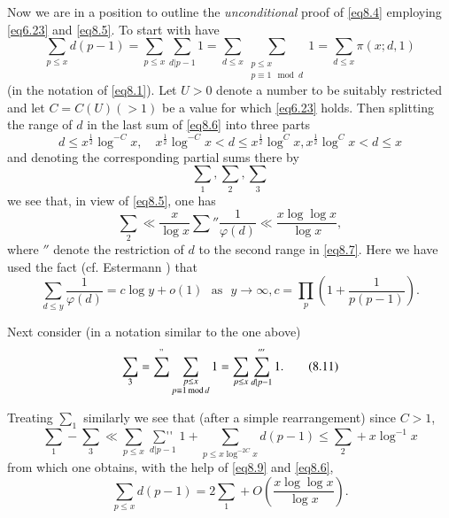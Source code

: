 Now we are in a position to outline the \textit{unconditional} proof
of \eqref{eq8.4} employing \eqref{eq6.23} and \eqref{eq8.5}. To start
with have   
\begin{equation*}
\sum_{p \leq x} d(p-1) = \sum_{p \leq x}\sum_{d | p-1}1 = \sum_{d \leq
  x} \sum_{\substack {p \leq x \\ {p \equiv 1 \mod d}}}1 = \sum_{d
  \leq x} \pi (x;d,1) \tag{8.6}\label{eq8.6} 
\end{equation*}
(in the notation of \eqref{eq8.1}). Let $U > 0$ denote a number to be
suitably restricted and let $C = C(U)( > 1)$ be a value for which
\eqref{eq6.23} holds. Then splitting the range of $d$ in the last sum of
\eqref{eq8.6} into three parts 
\begin{equation*}
d \leq x^{\frac{1}{2}} \log^{-C}x,\quad x^{\frac{1}{2}} \log^{-C}x < d
\leq x^{\frac{1}{2}} \log^{C}x, x^{\frac{1}{2}} \log^{C}x < d \leq x
\tag{8.7}\label{eq8.7} 
\end{equation*}
and denoting the corresponding partial sums there by 
\begin{equation*}
\sum_1 , \sum_2, \sum_3 \tag{8.8}\label{eq8.8}
\end{equation*}
we see that, in view of \eqref{eq8.5}, one has
\begin{equation*}
\sum_2 \ll \frac{x}{\log x} \sum '' \frac{1}{\varphi (d)} \ll \frac{x
  \log \log x}{\log x}, \tag{8.9}\label{eq8.9} 
\end{equation*}
where $''$  denote the restriction of $d$ to the second range in
\eqref{eq8.7}. Here we have used the fact (cf. Estermann \cite{key1})
that   
\begin{equation*}
\sum_{d \leq y} \frac{1}{\varphi (d)} = c \log y + o(1) \text{~ as~ } y
\to \infty , c = \prod_p (1+\frac{1}{p(p-1)}). \tag{8.10}\label{eq8.10} 
\end{equation*}

Next consider (in a notation similar to the one above)
\begin{equation*}
\sum_3 = \sum^{"} \sum_{\substack {p \leq x \\ { p \equiv 1 \mod d }}}
1 =\sum_{p \leq x} \sum ^{'''}_{d|p-1} 1. \tag{8.11}\label{eq8.11} 
\end{equation*}

Treating $\sum_1$ similarly we see that (after a simple rearrangement)
since $C>1$, 
\begin{equation*}
\sum_1 -\sum_3 \ll \sum_{p\leq x} \mathop{\sum{}''}\limits_{d|p-1} 1 +
\sum_{p \leq x \log^{-2C}x} d(p-1) \leq \sum_2 + x \log^{-1} x
\tag{8.12}\label{eq8.12}  
\end{equation*}\pageoriginale
from which one obtains, with the help of \eqref{eq8.9} and \eqref{eq8.6}, 
\begin{equation*}
\sum_{p \leq x} d(p-1) = 2 \sum_1 + O (\frac{x \log \log x}{\log
  x}). \tag{8.13}\label{eq8.13} 
\end{equation*}

